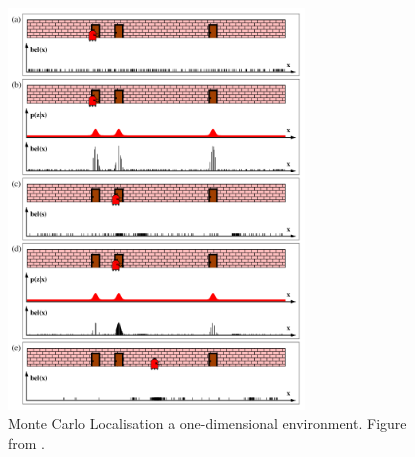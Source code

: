 \begin{figure}[htp]
  \centering
  \includegraphics[width = 0.7\textwidth]{Figures/figMCL.pdf}
  \caption{Monte Carlo Localisation a one-dimensional environment. Figure from \cite{ThrunSebastian2005Pr}.}
  \label{fig:monteCarloLocalisation}
\end{figure}

